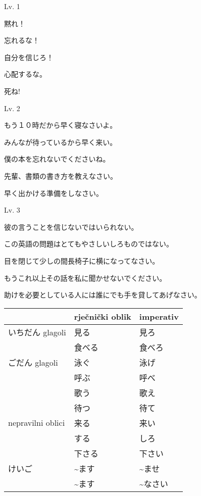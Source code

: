 	\begin{mondai}{Lv. 1}
		\item 黙れ！
		\item 忘れるな！
		\item 自分を信じろ！
		\item 心配するな。
		\item 死ね!
	\end{mondai}

	\begin{mondai}{Lv. 2}
		\item もう１０時だから早く寝なさいよ。
		\item みんなが待っているから早く来い。
		\item 僕の本を忘れないでくださいね。
		\item 先輩、書類の書き方を教えなさい。
		\item 早く出かける準備をしなさい。
	\end{mondai}

	\begin{mondai}{Lv. 3}
		\item 彼の言うことを信じないではいられない。
		\item この英語の問題はとてもやさしいしろものではない。
		\item 目を閉じて少しの間長椅子に横になってなさい。
		\item もうこれ以上その話を私に聞かせないでください。
		\item 助けを必要としている人には誰にでも手を貸してあげなさい。
	\end{mondai}

		\begin{table}[h]
			\centering
			\begin{tabular}{l| l l}\toprule[2pt]
				& rječnički oblik & imperativ\\
				\midrule
				いちだん glagoli & 見る　& 見ろ\\
				& 食べる & 食べろ\\
				\midrule
				ごだん glagoli &泳ぐ & 泳げ\\
				& 呼ぶ  &  呼べ\\
				& 歌う  & 歌え\\
				& 待つ & 待て\\
				\midrule
				nepravilni oblici&来る & 来い\\
				& する & しろ\\
				& 下さる & 下さい\\
				\midrule
				けいご& \textasciitilde ます & \textasciitilde ませ\\
				& \textasciitilde ます & \textasciitilde なさい\\
				\bottomrule[2pt]
			\end{tabular}
		\end{table}
	
